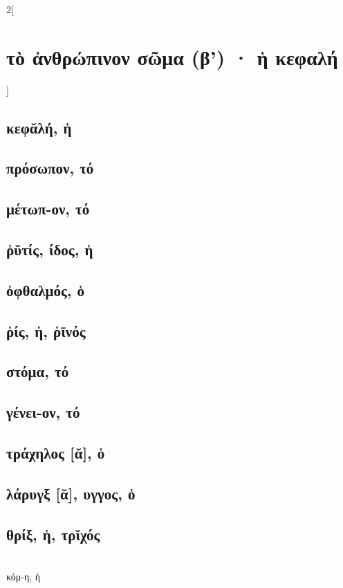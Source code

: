\documentclass{book}
\begin{document}
\begin{multicols}{2}[\section{τὸ ἀνθρώπινον σῶμα (β') · ἡ κεφαλή}]
\subsection{κεφᾰλή, ἡ}
\subsection{πρόσωπον, τό}
\subsection{μέτωπ-ον, τό}
\subsection{ῥῠτίς, ίδος, ἡ}
\subsection{ὀφθαλμός, ὁ}   
\subsection{ῥίς, ἡ, ῥῑνός}
\subsection{στόμα, τό}       
\subsection{γένει-ον, τό}    
\subsection{τράχηλος [ᾰ], ὁ} 
\subsection{λάρυγξ [ᾰ], υγγος, ὁ}
\subsection{θρίξ, ἡ, τρῐχός}  ~\\
κόμ-η, ἡ 

\end{multicols}
\end{document}
